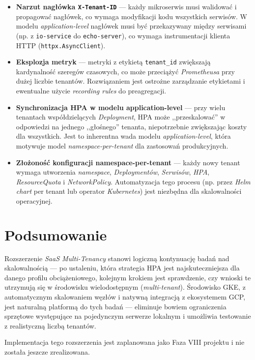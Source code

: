 \begin{itemize}
  \item \textbf{Narzut nagłówka \texttt{X-Tenant-ID}} — każdy mikroserwis musi walidować i propagować nagłówek, co wymaga modyfikacji kodu wszystkich serwisów. W modelu \textit{application-level} nagłówek musi być przekazywany między serwisami (np. z \texttt{io-service} do \texttt{echo-server}), co wymaga instrumentacji klienta HTTP (\texttt{httpx.AsyncClient}).

  \item \textbf{Eksplozja metryk} — metryki z etykietą \texttt{tenant\_id} zwiększają kardynalność szeregów czasowych, co może przeciążyć \textit{Prometheusa} przy dużej liczbie tenantów. Rozwiązaniem jest ostrożne zarządzanie etykietami i ewentualne użycie \textit{recording rules} do preagregacji.

  \item \textbf{Synchronizacja HPA w modelu application-level} — przy wielu tenantach współdzielących \textit{Deployment}, HPA może ,,przeskalować'' w odpowiedzi na jednego ,,głośnego'' tenanta, niepotrzebnie zwiększając koszty dla wszystkich. Jest to inherentna wada modelu \textit{application-level}, która motywuje model \textit{namespace-per-tenant} dla zastosowań produkcyjnych.

  \item \textbf{Złożoność konfiguracji namespace-per-tenant} — każdy nowy tenant wymaga utworzenia \textit{namespace}, \textit{Deploymentów}, \textit{Serwisów}, \textit{HPA}, \textit{ResourceQuota} i \textit{NetworkPolicy}. Automatyzacja tego procesu (np. przez \textit{Helm chart} per tenant lub operator \textit{Kubernetes}) jest niezbędna dla skalowalności operacyjnej.
\end{itemize}

\section{Podsumowanie}

Rozszerzenie \textit{SaaS Multi-Tenancy} stanowi logiczną kontynuację badań nad skalowalnością — po ustaleniu, która strategia HPA jest najskuteczniejsza dla danego profilu obciążeniowego, kolejnym krokiem jest sprawdzenie, czy wnioski te utrzymują się w środowisku wielodostępnym (\textit{multi-tenant}). Środowisko GKE, z automatycznym skalowaniem węzłów i natywną integracją z ekosystemem GCP, jest naturalną platformą do tych badań — eliminuje bowiem ograniczenia sprzętowe występujące na pojedynczym serwerze lokalnym i umożliwia testowanie z realistyczną liczbą tenantów.

Implementacja tego rozszerzenia jest zaplanowana jako Faza VIII projektu i nie została jeszcze zrealizowana.
